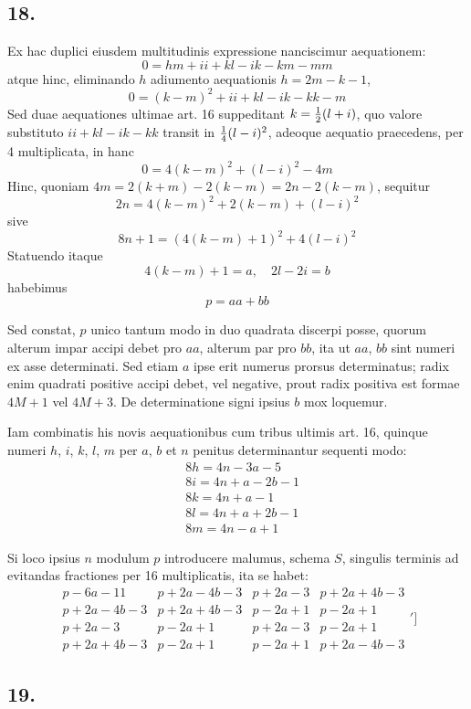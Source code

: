 \documentclass[twoside,12pt, showframe]{memoir}
\let\oldfrac\frac
\def\frac#1#2{\mathchoice{\tfrac{#1}{#2}}{\oldfrac{#1}{#2}}{\genfrac{}{}{}{2}{#1}{#2\mathstrut}}{\genfrac{}{}{}{3}{#1}{#2\mathstrut}}}
\begin{document}
\subsection*{18.}
 
Ex hac duplici eiusdem multitudinis expressione nanciscimur aequationem:
\[0=h m+i i+k l-i k-k m-m m\]
atque hinc, eliminando \(h\) adiumento aequationis \(h=2 m-k-1\),
\[0=(k-m)^{2}+i i+k l-i k-k k-m\]
Sed duae aequationes ultimae art. 16 suppeditant \(k=\frac{1}{2}(l+i)\), quo valore substituto \(i i+k l-i k-k k\) transit in \(\frac{1}{4}(l-i)^{2}\), adeoque aequatio praecedens, per 4 multiplicata, in hanc
\[0=4(k-m)^{2}+(l-i)^{2}-4 m\]
Hinc, quoniam \(4 m=2(k+m)-2(k-m)=2 n-2(k-m)\), sequitur
\[2 n=4(k-m)^{2}+2(k-m)+(l-i)^{2}\]
sive
\[8 n+1=(4(k-m)+1)^{2}+4(l-i)^{2}\]
Statuendo itaque
\[4(k-m)+1=a,\quad 2 l-2 i=b\]
habebimus
\[p=a a+b b\]

Sed constat, \(p\) unico tantum modo in duo quadrata discerpi posse, quorum alterum impar accipi debet pro \(a a\), alterum par pro \(b b\), ita ut \(a a\), \(b b\) sint numeri ex asse determinati. Sed etiam \(a\) ipse erit numerus prorsus determinatus; radix enim quadrati positive accipi debet, vel negative, prout radix positiva est formae \(4 M+1\) vel \(4 M+3\). De determinatione signi ipsius \(b\) mox loquemur.

Iam combinatis his novis aequationibus cum tribus ultimis art. 16, quinque numeri \(h\), \(i\), \(k\), \(l\), \(m\) per \(a\), \(b\) et \(n\) penitus determinantur sequenti modo:\clearpage\noindent%
\[\begin{aligned}
& 8 h=4 n-3 a-5 \\
& 8 i=4 n+a-2 b-1 \\
& 8 k=4 n+a-1 \\
& 8 l=4 n+a+2 b-1 \\
& 8 m=4 n-a+1
\end{aligned}\]

Si loco ipsius \(n\) modulum \(p\) introducere malumus, schema \({S}\), singulis terminis ad evitandas fractiones per 16 multiplicatis, ita se habet:
\[\begin{array}{l|l|l|l}
p-6 a-11 & p+2 a-4 b-3 & p+2 a-3 & p+2 a+4 b-3 \\
p+2 a-4 b-3 & p+2 a+4 b-3 & p-2 a+1 & p-2 a+1 \\
p+2 a-3 & p-2 a+1 & p+2 a-3 & p-2 a+1 \\
p+2 a+4 b-3 & p-2 a+1 & p-2 a+1 & p+2 a-4 b-3
\end{array}']\]

\subsection*{19.}
 
\end{document}
